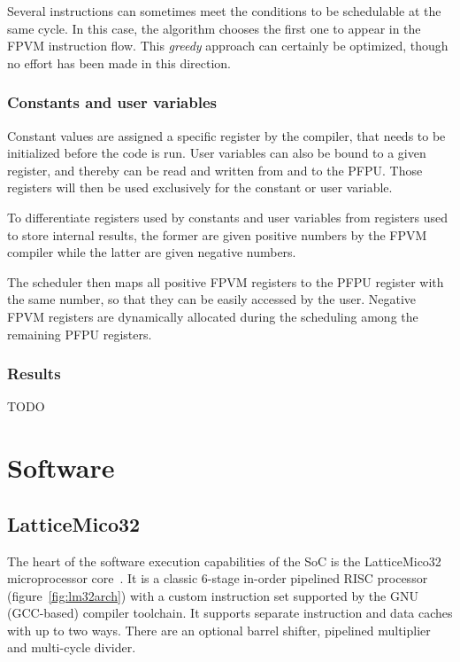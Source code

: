 \documentclass[a4paper,11pt]{kthesis}
\begin{document}
Several instructions can sometimes meet the conditions to be schedulable at the same cycle. In this case, the algorithm chooses the first one to appear in the FPVM instruction flow. This \textit{greedy} approach can certainly be optimized, though no effort has been made in this direction.

\subsection{Constants and user variables}
\label{subsec:constparam}
Constant values are assigned a specific register by the compiler, that needs to be initialized before the code is run. User variables can also be bound to a given register, and thereby can be read and written from and to the PFPU. Those registers will then be used exclusively for the constant or user variable.

To differentiate registers used by constants and user variables from registers used to store internal results, the former are given positive numbers by the FPVM compiler while the latter are given negative numbers.

The scheduler then maps all positive FPVM registers to the PFPU register with the same number, so that they can be easily accessed by the user. Negative FPVM registers are dynamically allocated during the scheduling among the remaining PFPU registers.

\subsection{Results}
TODO

\chapter{Software}
\label{ch:sw}
\section{LatticeMico32}
\label{sec:mico32}
The heart of the software execution capabilities of the SoC is the LatticeMico32 microprocessor core~\cite{mico32}. It is a classic 6-stage in-order pipelined RISC processor (figure~\ref{fig:lm32arch}) with a custom instruction set supported by the GNU (GCC-based) compiler toolchain. It supports separate instruction and data caches with up to two ways. There are an optional barrel shifter, pipelined multiplier and multi-cycle divider.
\end{document}
